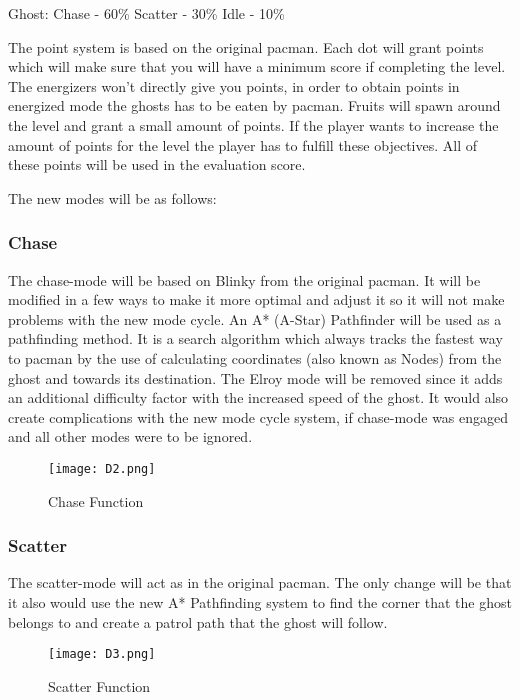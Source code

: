 \begin{center}
Ghost:
Chase - 60\%
Scatter - 30\%
Idle - 10\%
\end{center}


The point system is based on the original pacman. Each dot will grant points which will make sure that you will have a minimum score if completing the level. The energizers won’t directly give you points, in order to obtain points in energized mode the ghosts has to be eaten by pacman. Fruits will spawn around the level and grant a small amount of points. If the player wants to increase the amount of points for the level the player has to fulfill these objectives. All of these points will be used in the evaluation score.


The new modes will be as follows:

\subsubsection{Chase}
The chase-mode will be based on Blinky from the original pacman. It will be modified in a few ways to make it more optimal and adjust it so it will not make problems with the new mode cycle. An A* (A-Star) Pathfinder will be used as a pathfinding method. It is a search algorithm which always tracks the fastest way to pacman by the use of calculating coordinates (also known as Nodes) from the ghost and towards its destination. The Elroy mode will be removed since it adds an additional difficulty factor with the increased speed of the ghost. It would also create complications with the new mode cycle system, if chase-mode was engaged and all other modes were to be ignored.


\begin{figure}[!htbp]
\centering
\texttt{[image: D2.png]}
\caption{ Chase Function }
\label{fig:Chase}
\end{figure}


\subsubsection{Scatter}
The scatter-mode will act as in the original pacman. The only change will be that it also would use the new A* Pathfinding system to find the corner that the ghost belongs to and create a patrol path that the ghost will follow.


\begin{figure}[!htbp]
\centering
\texttt{[image: D3.png]}
\caption{ Scatter Function }
\label{fig:Scatter}
\end{figure}


